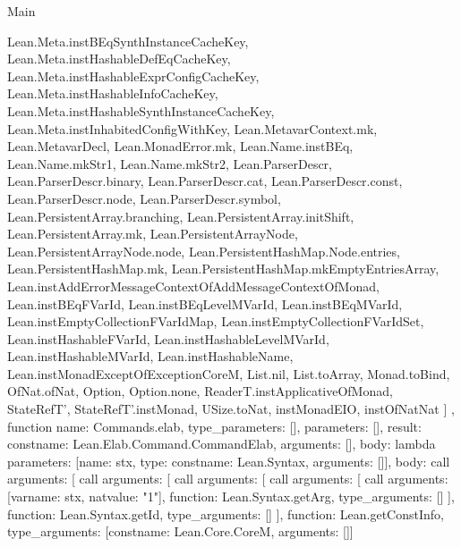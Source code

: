 \begin{lexlean}{Main}
\begin{toolingmodule}
{{        Lean.Meta.instBEqSynthInstanceCacheKey,
        Lean.Meta.instHashableDefEqCacheKey,
        Lean.Meta.instHashableExprConfigCacheKey,
        Lean.Meta.instHashableInfoCacheKey,
        Lean.Meta.instHashableSynthInstanceCacheKey,
        Lean.Meta.instInhabitedConfigWithKey,
        Lean.MetavarContext.mk,
        Lean.MetavarDecl,
        Lean.MonadError.mk,
        Lean.Name.instBEq,
        Lean.Name.mkStr1,
        Lean.Name.mkStr2,
        Lean.ParserDescr,
        Lean.ParserDescr.binary,
        Lean.ParserDescr.cat,
        Lean.ParserDescr.const,
        Lean.ParserDescr.node,
        Lean.ParserDescr.symbol,
        Lean.PersistentArray.branching,
        Lean.PersistentArray.initShift,
        Lean.PersistentArray.mk,
        Lean.PersistentArrayNode,
        Lean.PersistentArrayNode.node,
        Lean.PersistentHashMap.Node.entries,
        Lean.PersistentHashMap.mk,
        Lean.PersistentHashMap.mkEmptyEntriesArray,
        Lean.instAddErrorMessageContextOfAddMessageContextOfMonad,
        Lean.instBEqFVarId,
        Lean.instBEqLevelMVarId,
        Lean.instBEqMVarId,
        Lean.instEmptyCollectionFVarIdMap,
        Lean.instEmptyCollectionFVarIdSet,
        Lean.instHashableFVarId,
        Lean.instHashableLevelMVarId,
        Lean.instHashableMVarId,
        Lean.instHashableName,
        Lean.instMonadExceptOfExceptionCoreM,
        List.nil,
        List.toArray,
        Monad.toBind,
        OfNat.ofNat,
        Option,
        Option.none,
        ReaderT.instApplicativeOfMonad,
        StateRefT',
        StateRefT'.instMonad,
        USize.toNat,
        instMonadEIO,
        instOfNatNat
      ]
    },
    function{
      name: Commands.elab,
      type_parameters: [],
      parameters: [],
      result: const{name: Lean.Elab.Command.CommandElab, arguments: []},
      body: lambda{
        parameters: [{name: stx, type: const{name: Lean.Syntax, arguments: []}}],
        body: call{
          arguments: [
            call{
              arguments: [
                call{
                  arguments: [
                    call{
                      arguments: [
                        call{
                          arguments: [var{name: stx}, nat{value: "1"}],
                          function: Lean.Syntax.getArg,
                          type_arguments: []
                        }
                      ],
                      function: Lean.Syntax.getId,
                      type_arguments: []
                    }
                  ],
                  function: Lean.getConstInfo,
                  type_arguments: [const{name: Lean.Core.CoreM, arguments: []}]
}}}}}}
\end{toolingmodule}
\end{lexlean}

